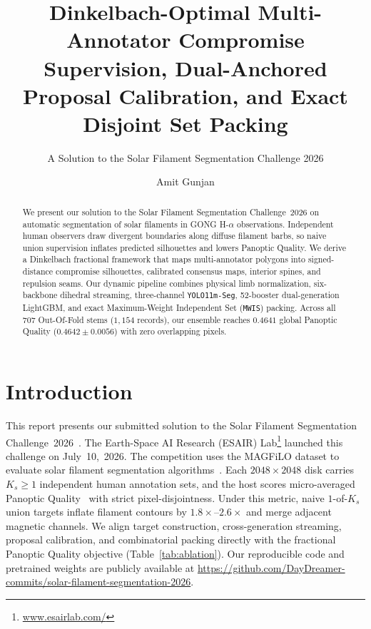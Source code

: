 \documentclass[sigconf]{acmart}
\begin{document}
\title[Dinkelbach Compromise Supervision and Exact MWIS Packing]{Dinkelbach-Optimal Multi-Annotator Compromise Supervision, Dual-Anchored Proposal Calibration, and Exact Disjoint Set Packing}
\subtitle{A Solution to the Solar Filament Segmentation Challenge 2026} %

\author{Amit Gunjan}

\begin{abstract}
    We present our solution to the Solar Filament Segmentation Challenge~2026 on automatic segmentation of solar filaments in GONG H-$\alpha$ observations. Independent human observers draw divergent boundaries along diffuse filament barbs, so naive union supervision inflates predicted silhouettes and lowers Panoptic Quality. We derive a Dinkelbach fractional framework that maps multi-annotator polygons into signed-distance compromise silhouettes, calibrated consensus maps, interior spines, and repulsion seams. Our dynamic pipeline combines physical limb normalization, six-backbone dihedral streaming, three-channel \texttt{YOLO11m-Seg}, 52-booster dual-generation LightGBM, and exact Maximum-Weight Independent Set (\texttt{MWIS}) packing. Across all 707 Out-Of-Fold stems ($1{,}154$ records), our ensemble reaches $0.4641$ global Panoptic Quality ($0.4642 \pm 0.0056$) with zero overlapping pixels.
\end{abstract}

\maketitle

\section{Introduction}
    This report presents our submitted solution to the Solar Filament Segmentation Challenge~2026~\cite{filament-segmentation-2026}. The Earth-Space AI Research (ESAIR) Lab\footnote{\href{https://www.esairlab.com/home}{www.esairlab.com/}} launched this challenge on July~10,~2026. The competition uses the MAGFiLO dataset to evaluate solar filament segmentation algorithms~\cite{ahmadzadeh2024dataset}. Each $2048 \times 2048$ disk carries $K_s \ge 1$ independent human annotation sets, and the host scores micro-averaged Panoptic Quality~\cite{kirillov2019panoptic} with strict pixel-disjointness. Under this metric, naive $1$-of-$K_s$ union targets inflate filament contours by $1.8\times$--$2.6\times$ and merge adjacent magnetic channels. We align target construction, cross-generation streaming, proposal calibration, and combinatorial packing directly with the fractional Panoptic Quality objective (Table~\ref{tab:ablation}). Our reproducible code and pretrained weights are publicly available at \url{https://github.com/DayDreamer-commits/solar-filament-segmentation-2026}.
\end{document}
